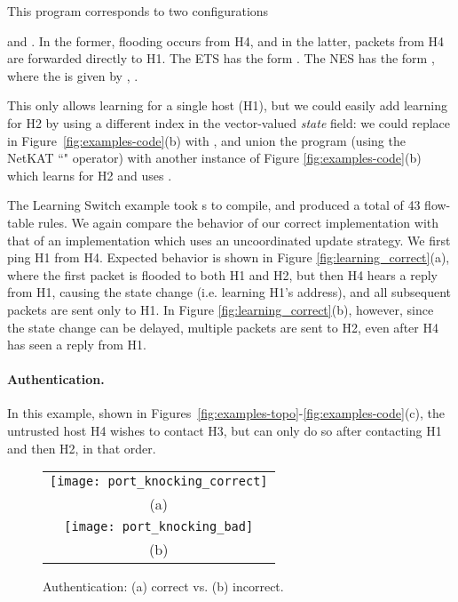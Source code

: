 \documentclass[pldi-cameraready]{sigplanconf}
\begin{document}
This program  corresponds to two configurations

and
.
In the former, flooding occurs from H4, and in the
latter, packets from H4 are forwarded directly to H1.
The ETS has the form .
The NES has the form ,
where the  is given by , .

This only allows learning for a single host (H1), but
we could easily add learning for H2 by using a different index in the vector-valued {\em state} field:
we could replace  in Figure~\ref{fig:examples-code}(b) with ,
and union the program (using the NetKAT ``" operator) with another instance of
Figure \ref{fig:examples-code}(b) which learns for H2 and uses .

The Learning Switch example took s to compile, and produced a total of 43 flow-table rules. We again compare the behavior of our correct implementation with that of an
implementation which uses an uncoordinated update strategy.
We first ping H1 from H4. Expected behavior is shown in Figure \ref{fig:learning_correct}(a), 
where the first packet is flooded to both H1 and H2, but then H4 hears a
reply from H1, causing the state change (i.e. learning H1's address),
and all subsequent packets are sent only to H1.
In Figure \ref{fig:learning_correct}(b), however, since the state change can be
delayed, multiple packets are sent to H2, even after H4 has seen a reply from H1.




\paragraph{Authentication.} In this example, shown in Figures~\ref{fig:examples-topo}-\ref{fig:examples-code}(c), the untrusted host H4 wishes to contact H3,
but can only do so after contacting H1 and then H2, in
that order.

\begin{figure}
\centering
\bgroup
\def\arraystretch{0.5}
\begin{tabular}{c}
\texttt{[image: port\_knocking\_correct]} \\
{\scriptsize (a)} \\
\texttt{[image: port\_knocking\_bad]} \\
{\scriptsize (b)}
\end{tabular}
\egroup
\caption{Authentication: (a) correct vs. (b) incorrect.}
\label{fig:knocking_correct}
\end{figure}
\end{document}
